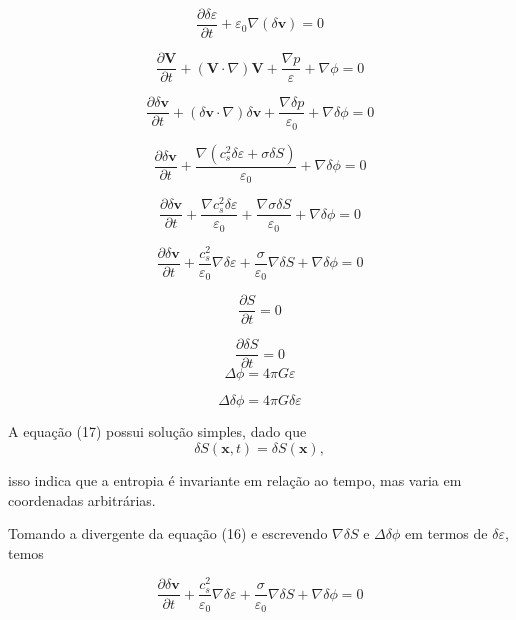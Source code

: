 \documentclass[a4paper,12pt]{article}
\begin{document}
\begin{equation}
	\dfrac{\partial\delta\varepsilon}{\partial t} + \varepsilon_0 \nabla (\delta\textbf{v}) = 0
\end{equation}
\newline

$$\dfrac{\partial\textbf{V}}{\partial t} + (\textbf{V} \cdot \nabla ) \textbf{V} + \frac{\nabla p}{\varepsilon} + \nabla \phi =0$$

$$\dfrac{\partial\delta\textbf{v}}{\partial t} + (\delta\textbf{v} \cdot \nabla ) \delta\textbf{v} + \frac{\nabla \delta p}{\varepsilon_0} + \nabla \delta\phi =0$$

$$\dfrac{\partial\delta\textbf{v}}{\partial t} + \frac{\nabla (c_s^2\delta\varepsilon + \sigma\delta S )}{\varepsilon_0} + \nabla \delta\phi =0$$

$$\dfrac{\partial\delta\textbf{v}}{\partial t} +\frac{\nabla c_s^2\delta\varepsilon }{\varepsilon_0} + \frac{\nabla \sigma\delta S }{\varepsilon_0} + \nabla \delta\phi =0$$

\begin{equation}
	\dfrac{\partial\delta\textbf{v}}{\partial t} + \dfrac{c^2_s}{\varepsilon_0} \nabla\delta\varepsilon + \dfrac{\sigma}{\varepsilon_0}\nabla\delta S + \nabla\delta\phi = 0
\end{equation}
\newline

$$\dfrac{\partial S}{\partial t} = 0$$

\begin{equation}
	\dfrac{\partial\delta S}{\partial t} = 0
\end{equation}
\newline
$$\Delta\phi = 4\pi G\varepsilon$$

\begin{equation}
	\Delta\delta\phi = 4\pi G\delta\varepsilon
\end{equation}

A equação (17) possui solução simples, dado que
\begin{equation}
	\delta S (\textbf{x},t) =\delta S (\textbf{x}),
\end{equation}

isso indica que a entropia é invariante em relação ao tempo, mas varia em coordenadas arbitrárias.

Tomando a divergente da equação (16) e escrevendo $\nabla\delta S$ e $\Delta\delta\phi$ em termos de $\delta\varepsilon$, temos

$$\dfrac{\partial\delta\textbf{v}}{\partial t} + \dfrac{c^2_s}{\varepsilon_0} \nabla\delta\varepsilon + \dfrac{\sigma}{\varepsilon_0}\nabla\delta S + \nabla\delta\phi = 0$$
\end{document}
